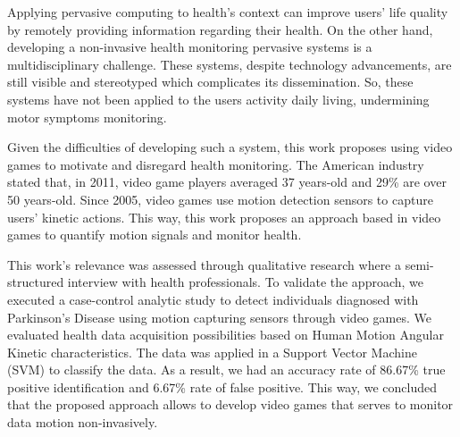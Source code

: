 
Applying pervasive computing to health's context can improve users' life quality by remotely providing information regarding their health. On the other hand, developing a non-invasive health monitoring pervasive systems is a multidisciplinary challenge. These systems, despite technology advancements, are still visible and stereotyped which complicates its dissemination. So, these systems have not been applied to the users activity daily living, undermining motor symptoms monitoring.

Given the difficulties of developing such a system, this work proposes using video games to motivate and disregard health monitoring. The American industry stated that, in 2011, video game players averaged 37 years-old and 29\% are over 50 years-old. Since 2005, video games use motion detection sensors to capture users' kinetic actions. This way, this work proposes an approach based in video games to quantify motion signals and monitor health.

This work's relevance was assessed through qualitative research where a semi-structured interview with health professionals. To validate the approach, we executed a case-control analytic study to detect individuals diagnosed with Parkinson's Disease using motion capturing sensors through video games. We evaluated health data acquisition possibilities based on Human Motion Angular Kinetic characteristics. The data was applied in a Support Vector Machine (SVM) to classify the data. As a result, we had an accuracy rate of 86.67\% true positive identification and 6.67\% rate of false positive. This way, we concluded that the proposed approach allows to develop video games that serves to monitor data motion non-invasively.